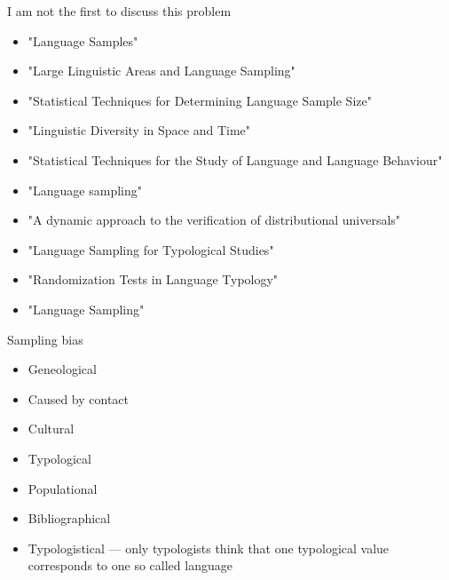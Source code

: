 \documentclass[13pt, t]{beamer}
\begin{document}
\begin{frame}{I am not the first to discuss this problem}
\begin{itemize}
\item \citep{bell78} "Language Samples"
\item \citep{dryer89} "Large Linguistic Areas and Language Sampling"
\item \citep{perkins89} "Statistical Techniques for Determining Language Sample Size"
\item \citep{nichols92} "Linguistic Diversity in Space and Time"
\item \citep{rietveld93} "Statistical Techniques for the Study of Language and Language Behaviour"
\item \citep{rijkhoff98} "Language sampling"
\item \citep{maslova00} "A dynamic approach to the verification of distributional universals"
\item \citep{widmann01} "Language Sampling for Typological Studies"
\item \citep{janssen06} "Randomization Tests in Language Typology"
\item \citep{bakker10} "Language Sampling"
\end{itemize}
\end{frame}

\begin{frame}{Sampling bias}
\begin{itemize}
\item Geneological
\item Caused by contact
\item Cultural
\item Typological
\item Populational \pause
\item \Large \alert{Bibliographical} \pause
\item \LARGE \alert{Typologistical} --- only typologists think that one typological value corresponds to one so called language
\end{itemize}
\end{frame}
\end{document}

